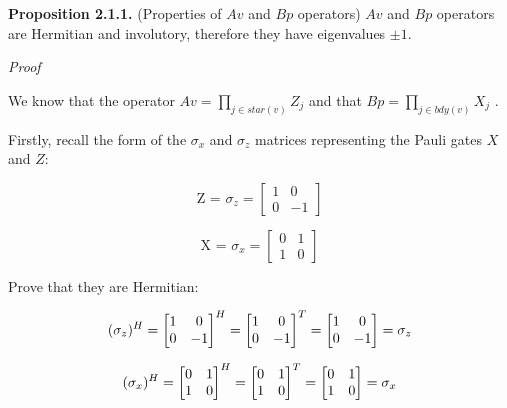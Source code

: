 \documentclass[12pt]{report}
\begin{document}
	\begin{minipage}{1\textwidth}
		
		
		
		\textbf{Proposition 2.1.1.} (Properties of $Av$ and $Bp$ operators) $Av$ and $Bp$ operators are Hermitian and involutory, therefore they have eigenvalues $\pm 1$.
		\newline
		
		\textit{Proof}\newline
		
		We know that the operator $ Av = \prod_{j \in star(v)} Z_j $ and that $ Bp = \prod_{j \in bdy(v)} X_j $ .\newline
		
		Firstly, recall the form of the $\sigma_x$ and $\sigma_z$ matrices representing the Pauli gates $X$ and $Z$:
		
		
		
		\[
		\text{Z = $\sigma_z$} =
		\begin{bmatrix}
			1 & 0 \\
			0 & -1
		\end{bmatrix}
		\]
		
		
		\[
		\text{X = $\sigma_x$} =
		\begin{bmatrix}
			0 & 1 \\
			1 & 0
		\end{bmatrix}
		\]
		
		
		Prove that they are Hermitian:\newline
		
		\[
		\text{$( \sigma_z )^{H}$} = 
		\begin{bmatrix}
			1 & 0 \\
			0 & -1
		\end{bmatrix} ^H =
		\begin{bmatrix}
			1 & 0 \\
			0 & -1
		\end{bmatrix}^T =
		\begin{bmatrix}
			1 & 0 \\
			0 & -1
		\end{bmatrix}
		= \text{$ \sigma_z $}
		\]
		
		
		\[
		\text{$( \sigma_x )^{H}$} = 
		\begin{bmatrix}
			0 & 1 \\
			1 & 0
		\end{bmatrix} ^H =
		\begin{bmatrix}
			0 & 1 \\
			1 & 0
		\end{bmatrix}^T =
		\begin{bmatrix}
			0 & 1 \\
			1 & 0
		\end{bmatrix}
		= \text{$ \sigma_x $}
		\]\newline
		

\end{minipage}
\end{document}
